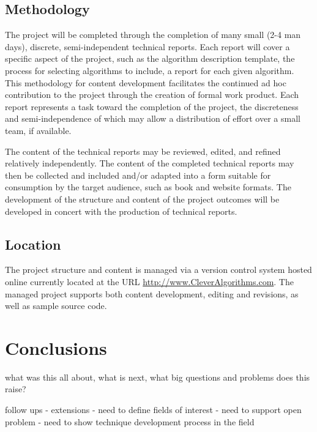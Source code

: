 \documentclass[a4paper, 11pt]{article}
\begin{document}
\subsection{Methodology}
The project will be completed through the completion of many small (2-4 man days), discrete, semi-independent technical reports. Each report will cover a specific aspect of the project, such as the algorithm description template, the process for selecting algorithms to include, a report for each given algorithm. This methodology for content development facilitates the continued ad hoc contribution to the project through the creation of formal work product. Each report represents a task toward the completion of the project, the discreteness and semi-independence of which may allow a distribution of effort over a small team, if available.

The content of the technical reports may be reviewed, edited, and refined relatively independently. The content of the completed technical reports may then be collected and included and/or adapted into a form suitable for consumption by the target audience, such as book and website formats. The development of the structure and content of the project outcomes will be developed in concert with the production of technical reports.

\subsection{Location}
The project structure and content is managed via a version control system hosted online currently located at the URL \url{http://www.CleverAlgorithms.com}. The managed project supports both content development, editing and revisions, as well as sample source code.

\section{Conclusions}
\label{sec:conclusions}
what was this all about, what is next, what big questions and problems does this raise?


follow ups - extensions
- need to define fields of interest
- need to support open problem
- need to show technique development process in the field
\end{document}
